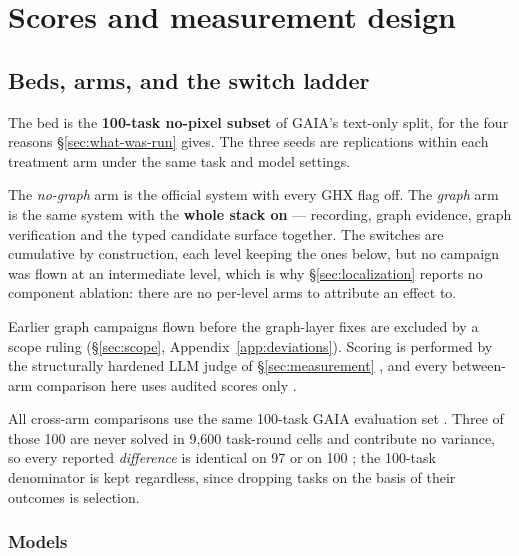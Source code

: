 \section{Scores and measurement design}

\subsection{Beds, arms, and the switch ladder}
\label{sec:beds}

The bed is the \textbf{100-task no-pixel subset} of GAIA's text-only
split, for the four reasons \S\ref{sec:what-was-run} gives. The three seeds
are replications within each treatment arm under the same task and model
settings.


The \emph{no-graph} arm is the official system with every GHX flag off.
The \emph{graph} arm is the same system with the \textbf{whole stack on}
--- recording, graph evidence, graph verification and the typed candidate
surface together. The switches are cumulative by construction, each level
keeping the ones below, but no campaign was flown at an intermediate
level, which is why \S\ref{sec:localization} reports no component
ablation: there are no per-level arms to attribute an effect to.

Earlier graph campaigns
flown before the graph-layer fixes are excluded by a scope ruling
(\S\ref{sec:scope}, Appendix~\ref{app:deviations}). Scoring is performed
by the structurally hardened LLM judge of \S\ref{sec:measurement} ,
and every between-arm comparison here uses audited scores only .

All cross-arm comparisons use the same 100-task GAIA evaluation set
. Three of those
100 are never solved in 9{,}600 task-round cells and contribute no variance, so
every reported \emph{difference} is identical on 97 or on 100 ; the
100-task denominator is kept regardless, since dropping tasks on the basis
of their outcomes is selection.

\subsubsection*{Models}

